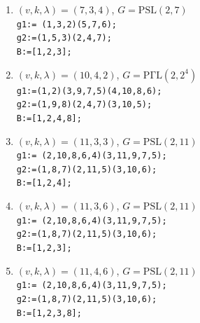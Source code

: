\documentclass[a4paper,twopage,reqno,12pt]{amsart}
\theoremstyle{definition}
\numberwithin{equation}{section}
\newcommand{\PSL}{\mathrm{PSL}}
\newcommand{\PGaL}{\mathrm{P\Gamma L}}
\newcommand{\PSigL}{\mathrm{P\Sigma L}}
\newcommand{\Aut}{\mathrm{Aut}}
\begin{document}
\begin{enumerate}
    \item\label{734}$(v,k,\lambda)=(7,3,4)$, $G=\PSL(2,7)$\\
    \texttt{g1:= (1,3,2)(5,7,6);}\\
    \texttt{g2:=(1,5,3)(2,4,7);}\\
    \texttt{B:=[1,2,3];}\\

    \item\label{1042}$(v,k,\lambda)=(10,4,2)$, $G=\PGaL(2,2^4)$\\
    \texttt{g1:=(1,2)(3,9,7,5)(4,10,8,6);}\\
    \texttt{g2:=(1,9,8)(2,4,7)(3,10,5);}\\
    \texttt{B:=[1,2,4,8];}\\

     \item\label{1133}$(v,k,\lambda)=(11,3,3)$, $G=\PSL(2,11)$\\
    \texttt{g1:= (2,10,8,6,4)(3,11,9,7,5);}\\
    \texttt{g2:=(1,8,7)(2,11,5)(3,10,6);}\\
    \texttt{B:=[1,2,4];}\\

    \item\label{1136}$(v,k,\lambda)=(11,3,6)$, $G=\PSL(2,11)$\\
    \texttt{g1:= (2,10,8,6,4)(3,11,9,7,5);}\\
    \texttt{g2:=(1,8,7)(2,11,5)(3,10,6);}\\
    \texttt{B:=[1,2,3];}\\

    \item\label{1146}$(v,k,\lambda)=(11,4,6)$, $G=\PSL(2,11)$\\
    \texttt{g1:= (2,10,8,6,4)(3,11,9,7,5);}\\
    \texttt{g2:=(1,8,7)(2,11,5)(3,10,6);}\\
    \texttt{B:=[1,2,3,8];}\\


\end{enumerate}
\end{document}
